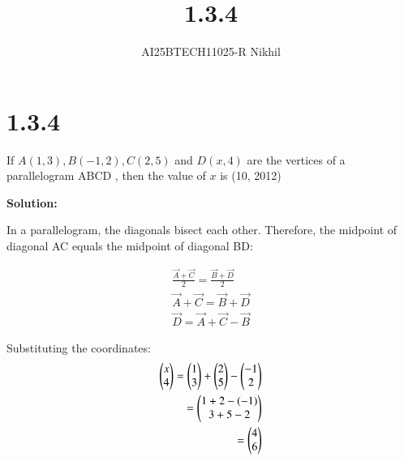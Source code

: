 \documentclass[journal]{IEEEtran}
\begin{document}

\vspace{3cm}

\title{1.3.4}
\author{AI25BTECH11025-R Nikhil}
 \maketitle
{\let\newpage\relax\maketitle}

\renewcommand{\thefigure}{\theenumi}
\renewcommand{\thetable}{\theenumi}
\setlength{\intextsep}{10pt} %


\renewcommand{\thetable}{\theenumi}


\section*{1.3.4}
If $ A(1, 3), B(-1, 2), C(2, 5) $ and $ D(x, 4) $ are the vertices of a parallelogram  ABCD , then the value of $x$ is \underline{\hspace{2cm}}(10, 2012)

\vspace{1em}
\textbf{Solution:}

In a parallelogram, the diagonals bisect each other. Therefore, the midpoint of diagonal AC equals the midpoint of diagonal BD:

\begin{align}
\frac{\vec{A} + \vec{C}}{2} = \frac{\vec{B} + \vec{D}}{2} \\
\vec{A} + \vec{C} = \vec{B} + \vec{D} \\
\vec{D} = \vec{A} + \vec{C} - \vec{B}
\end{align}

Substituting the coordinates:
\begin{align}
\begin{pmatrix} x \\ 4 \end{pmatrix} = \begin{pmatrix} 1 \\ 3 \end{pmatrix} + \begin{pmatrix} 2 \\ 5 \end{pmatrix} - \begin{pmatrix} -1 \\ 2 \end{pmatrix} \\
                 = \begin{pmatrix} 1 + 2 - (-1) \\ 3 + 5 - 2 \end{pmatrix} \\
                 = \begin{pmatrix} 4 \\ 6 \end{pmatrix}
\end{align}
\end{document}
